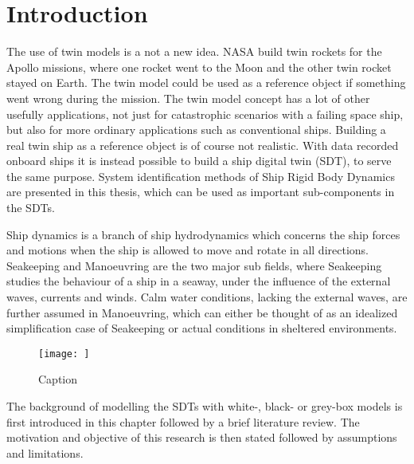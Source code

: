 \chapter{Introduction}
The use of twin models is a not a new idea. NASA build twin rockets for the Apollo missions, where one rocket went to the Moon and the other twin rocket stayed on Earth.
The twin model could be used as a reference object if something went wrong during the mission.  
The twin model concept has a lot of other usefully applications, not just for catastrophic scenarios with a failing space ship, but also for more ordinary applications such as conventional ships. Building a real twin ship as a reference object is of course not realistic. With data recorded onboard ships it is instead possible to build a ship digital twin (SDT), to serve the same purpose.
System identification methods of Ship Rigid Body Dynamics are presented in this thesis, which can be used as important sub-components in the SDTs. 

Ship dynamics is a branch of ship hydrodynamics which concerns the ship forces and motions when the ship is allowed to move and rotate in all directions. Seakeeping and Manoeuvring are the two major sub fields, where Seakeeping studies the  behaviour of a ship in a seaway, under the influence of the external waves, currents and winds. Calm water conditions, lacking the external waves, are further assumed in Manoeuvring, which can either be thought of as an idealized simplification case of Seakeeping or actual conditions in sheltered environments. 

\begin{figure}
    \centering
    \texttt{[image: ]}
    \caption{Caption}
    \label{fig:my_label}
\end{figure}

The background of modelling the SDTs with white-, black- or grey-box models is first introduced in this chapter followed by a brief literature review. The motivation and objective of this research is then stated followed by assumptions and limitations.

